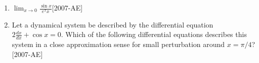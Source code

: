 \documentclass[journal]{IEEEtran}
\begin{document}
\begin{enumerate}
    \item $\lim_{x\to 0}\frac{\sin x}{e^x x}$\hfill{[2007-AE]}
        \begin{enumerate}
        \end{enumerate}
    \item Let a dynamical system be described by the differential equation $\displaystyle2\frac{dx}{dx} + \cos x = 0$. Which of the following differential equations describes this system in a close approximation sense for small perturbation around $x = \pi / 4$?\hfill{[2007-AE]}
        \begin{enumerate}
        \end{enumerate}


\end{enumerate}
\end{document}
